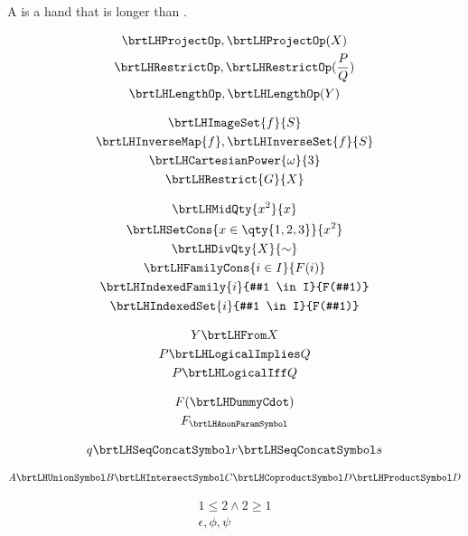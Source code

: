 \documentclass{article}
\begin{document}
    A  is a hand that is longer than
    .

    \begin{gather}
        \brtLHProjectOp ,
        \brtLHProjectOp(X)
        \\
        \brtLHRestrictOp ,
        \brtLHRestrictOp(\frac P Q)
        \\
        \brtLHLengthOp ,
        \brtLHLengthOp(Y)
    \end{gather}

    \begin{gather}
        \brtLHImageSet {f} {S}
        \\
        \brtLHInverseMap {f} ,
        \brtLHInverseSet {f} {S}
        \\
        \brtLHCartesianPower {\omega} {3}
        \\
        \brtLHRestrict {G} {X}
    \end{gather}

    \begin{gather}
        \brtLHMidQty {x^2} {x}
        \\
        \brtLHSetCons {x \in \qty{1,2,3}} {x^2}
        \\
        \brtLHDivQty {X} {\sim}
        \\
        \brtLHFamilyCons {i \in I} {F(i)}
        \\
        \brtLHIndexedFamily {i} {#1 \in I} {F(#1)}
        \\
        \brtLHIndexedSet {i} {#1 \in I} {F(#1)}
    \end{gather}

    \begin{gather}
        Y \brtLHFrom X
        \\
        P \brtLHLogicalImplies Q
        \\
        P \brtLHLogicalIff Q
    \end{gather}

    \begin{gather}
        F(\brtLHDummyCdot)
        \\
        F_{\brtLHAnonParamSymbol}
    \end{gather}

    \begin{gather}
        q
        \brtLHSeqConcatSymbol
        r
        \brtLHSeqConcatSymbol
        s
    \end{gather}

    \begin{gather}
        A
        \brtLHUnionSymbol B
        \brtLHIntersectSymbol C
        \brtLHCoproductSymbol D
        \brtLHProductSymbol D
    \end{gather}

    \begin{gather}
        1 \leq 2 \land
        2 \geq 1
        \\
        \epsilon
        , \phi
        , \psi
    \end{gather}
\end{document}
